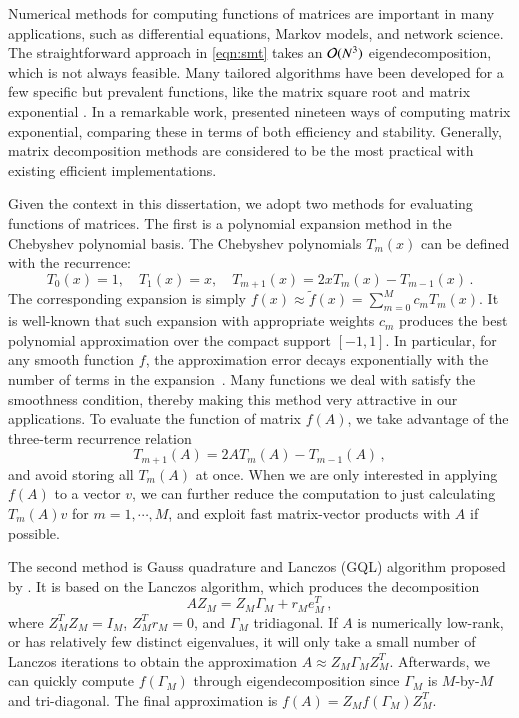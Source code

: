 Numerical methods for computing functions of matrices are important in many
applications, such as differential equations, Markov models, and network
science. The straightforward approach in \cref{eqn:smt} takes an $\mathcal{O}(N^3)$
eigendecomposition, which is not always feasible. Many tailored algorithms have
been developed for a few specific but prevalent functions, like the matrix
square root and matrix exponential \cite[Chapter 6 \& 10]{higham2008functions}.
In a remarkable work, \citet{moler2003nineteen} presented nineteen ways of
computing matrix exponential, comparing these in terms of both efficiency and
stability. Generally, matrix decomposition methods are considered to be the most
practical with existing efficient implementations.

Given the context in this dissertation, we adopt two methods for evaluating
functions of matrices. The first is a polynomial expansion method in the
Chebyshev polynomial basis. The Chebyshev polynomials $T_m(x)$ can be defined
with the recurrence:
\begin{equation}\label{eqn:cheb_3term}
	T_0(x) = 1,\quad T_1(x) = x,\quad T_{m+1}(x) = 2xT_m(x) - T_{m-1}(x)\,.
\end{equation}
The corresponding expansion is simply $f(x) \approx \tilde{f}(x)= \sum_
{m=0}^Mc_mT_m(x)$. It is well\hyp{}known that such expansion with appropriate
weights $c_m$ produces the best polynomial approximation over the compact
support $[-1,1]$. In particular, for any smooth function $f$, the approximation
error decays exponentially with the number of terms in the expansion~\cite{
Trefethen-2013-ATAP}. Many functions we deal with satisfy the smoothness
condition, thereby making this method very attractive in our applications. To
evaluate the function of matrix $f(A)$, we take advantage of the three\hyp{}term
recurrence relation
\begin{equation}\label{eqn:3term_fom}
	T_{m+1}(A) = 2AT_m(A)-T_{m-1}(A)\,,
\end{equation}
and avoid storing all $T_m(A)$ at once. When we are only interested in applying
$f(A)$ to a vector $v$, we can further reduce the computation to just
calculating $T_m(A)v$ for $m = 1,\cdots, M$, and exploit fast matrix\hyp{}vector
products with $A$ if possible.

The second method is Gauss quadrature and Lanczos (GQL) algorithm proposed by 
\citet{golub1997matrices}. It is based on the Lanczos algorithm, which produces
the decomposition
\begin{equation}\label{eqn:lan_decomp}
	AZ_M = Z_M\Gamma_M + r_Me_M^T\,,
\end{equation}
where $Z_M^TZ_M = I_M$, $Z_M^Tr_M = 0$, and $\Gamma_M$ tridiagonal. If $A$ is
numerically low\hyp{}rank, or has relatively few distinct eigenvalues, it will
only take a small number of Lanczos iterations to obtain the approximation
$A\approx Z_M\Gamma_MZ_M^T$. Afterwards, we can quickly compute $f(\Gamma_M)$
through eigendecomposition since $\Gamma_M$ is $M$\hyp{}by\hyp{}$M$ and
tri\hyp{}diagonal. The final approximation is $f(A) = Z_Mf(\Gamma_M)Z_M^T$.

